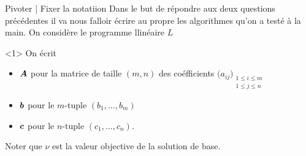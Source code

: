 \documentclass[aspectratio = 169]{beamer}
\begin{document}
\begin{frame}{Pivoter | Fixer la notatiion}
  Dans le but de répondre aux deux questions précédentes il va nous
  falloir écrire au propre les algorithmes qu'on a testé à la main. On
  considère le programme llinéaire $L$
  \begin{figure}
    \end{figure}
    \begin{overlayarea}{\textwidth}{.3\textheight}
        \begin{onlyenv}<1>
          On écrit
            \begin{itemize}
            \item[\textbullet]
              $\boldsymbol{A}$ pour la matrice de taille $(m, n)$ des coéfficients
              $\big(a_{ij}\big)_{\substack{1 \leq i \leq m \\ 1 \leq j \leq n}}$
            \item[\textbullet]
              $\boldsymbol{b}$ pour le $m$-tuple $(b_1, \ldots, b_m)$
            \item[\textbullet]
              $\boldsymbol{c}$ pour le $n$-tuple $(c_1, \ldots, c_n)$.
            \end{itemize}
            Noter que $\nu$ est la valeur objective de la solution de
            base.
        \end{onlyenv}

\end{overlayarea}
\end{frame}
\end{document}
